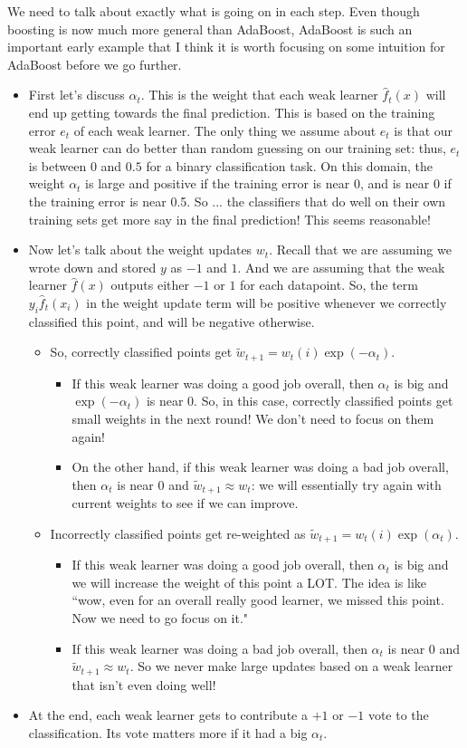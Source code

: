 We need to talk about exactly what is going on in each step. Even though boosting is now much more general than AdaBoost, AdaBoost is such an important early example that I think it is worth focusing on some intuition for AdaBoost before we go further.
\begin{itemize}
\item First let's discuss $\alpha_t$. This is the weight that each weak learner $\hat{f}_t(x)$ will end up getting towards the final prediction. This is based on the training error $e_t$ of each weak learner. The only thing we assume about $e_t$ is that our weak learner can do better than random guessing on our training set: thus, $e_t$ is between $0$ and $0.5$ for a binary classification task. On this domain, the weight $\alpha_t$ is large and positive if the training error is near 0, and is near 0 if the training error is near 0.5. So ... the classifiers that do well on their own training sets get more say in the final prediction! This seems reasonable!
\item Now let's talk about the weight updates $w_t$. Recall that we are assuming we wrote down and stored $y$ as $-1$ and $1$. And we are assuming that the weak learner $\hat{f}(x)$ outputs either $-1$ or $1$ for each datapoint. So, the term $y_i \hat{f}_t(x_i)$ in the weight update term will be positive whenever we correctly classified this point, and will be negative otherwise. 
\begin{itemize}
\item So, correctly classified points get $\tilde{w}_{t+1} = w_t(i) \exp (-\alpha_t)$. 
\begin{itemize}
\item If this weak learner was doing a good job overall, then $\alpha_t$ is big and $\exp (-\alpha_t)$ is near $0$. So, in this case, correctly classified points get small weights in the next round! We don't need to focus on them again! 
\item On the other hand, if this weak learner was doing a bad job overall, then $\alpha_t$ is near $0$ and $\tilde{w}_{t+1} \approx w_t$: we will essentially try again with current weights to see if we can improve. 
\end{itemize}
\item Incorrectly classified points get re-weighted as $\tilde{w}_{t+1} = w_t(i) \exp (\alpha_t)$. 
\begin{itemize}
\item If this weak learner was doing a good job overall, then $\alpha_t$ is big and we will increase the weight of this point a LOT. The idea is like ``wow, even for an overall really good learner, we missed this point. Now we need to go focus on it."
\item If this weak learner was doing a bad job overall, then $\alpha_t$ is near $0$ and $\tilde{w}_{t+1} \approx w_t$. So we never make large updates based on a weak learner that isn't even doing well! 
\end{itemize}
\end{itemize}
\item At the end, each weak learner gets to contribute a $+1$ or $-1$ vote to the classification. Its vote matters more if it had a big $\alpha_t$. 
\end{itemize}

